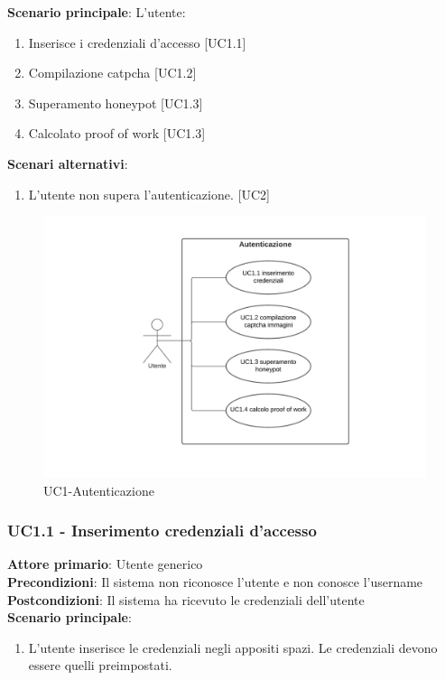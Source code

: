\textbf{Scenario principale}: L'utente:
\begin{enumerate}
\item Inserisce i credenziali d'accesso [UC1.1]
\item Compilazione catpcha [UC1.2]
\item Superamento honeypot [UC1.3]
\item Calcolato proof of work [UC1.3]
\end{enumerate}

\textbf{Scenari alternativi}:
\begin{enumerate}
    \item L’utente non supera l'autenticazione. [UC2]
\end{enumerate}

\begin{figure}[H]
    \centering
    \includegraphics[scale=0.8]{img/Autenticazione.png}
    \caption{UC1-Autenticazione}
\end{figure}

\subsubsection{UC1.1 - Inserimento credenziali d'accesso}
\textbf{Attore primario}: Utente generico\\
\textbf{Precondizioni}: Il sistema non riconosce l'utente e non conosce l'username\\
\textbf{Postcondizioni}: Il sistema ha ricevuto le credenziali dell'utente\\

\textbf{Scenario principale}:
\begin{enumerate}
   \item L'utente inserisce le credenziali negli appositi spazi. Le credenziali devono essere quelli preimpostati.
\end{enumerate}

